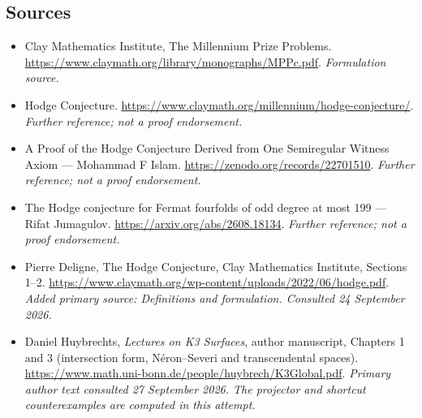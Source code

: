 \documentclass[11pt]{article}
\begin{document}
\subsection{Sources}
\begin{itemize}
\item[S1]Clay Mathematics Institute, The Millennium Prize Problems.
\url{https://www.claymath.org/library/monographs/MPPc.pdf}.
\textit{Formulation source.}
\item[S2]Hodge Conjecture.
\url{https://www.claymath.org/millennium/hodge-conjecture/}.
\textit{Further reference; not a proof endorsement.}
\item[S3]A Proof of the Hodge Conjecture Derived from One Semiregular Witness Axiom — Mohammad F Islam.
\url{https://zenodo.org/records/22701510}.
\textit{Further reference; not a proof endorsement.}
\item[S4]The Hodge conjecture for Fermat fourfolds of odd degree at most 199 — Rifat Jumagulov.
\url{https://arxiv.org/abs/2608.18134}.
\textit{Further reference; not a proof endorsement.}
\item[E1]Pierre Deligne, The Hodge Conjecture, Clay Mathematics Institute, Sections 1--2.
\url{https://www.claymath.org/wp-content/uploads/2022/06/hodge.pdf}.
\textit{Added primary source: Definitions and formulation. Consulted 24 September 2026.}
\item[E2]Daniel Huybrechts, \emph{Lectures on K3 Surfaces}, author manuscript, Chapters 1 and 3 (intersection form, N\'eron--Severi and transcendental spaces).
\url{https://www.math.uni-bonn.de/people/huybrech/K3Global.pdf}.
\textit{Primary author text consulted 27 September 2026. The projector and shortcut counterexamples are computed in this attempt.}
\end{itemize}
\end{document}
